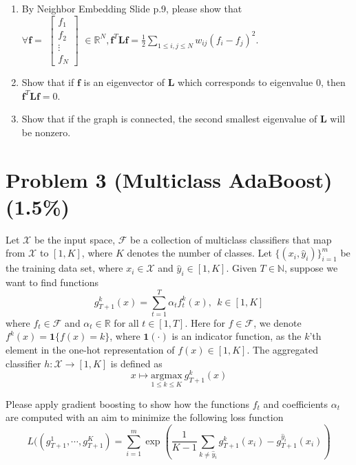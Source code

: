 \documentclass{article}
\begin{document}
\begin{enumerate}
\item By Neighbor Embedding Slide p.9, please show that \\
$ \forall \boldsymbol{f} =$
$\begin{bmatrix}
   f_1 \\
   f_2 \\
   \vdots \\
   f_N
\end{bmatrix}$
$\in \mathbb{R}^N, \boldsymbol{f}^T \boldsymbol{L} \boldsymbol{f}=\frac{1}{2}\sum\limits_{1 \leq i,j \leq N} w_{ij}(f_i-f_j)^2$.
\item Show that if $\boldsymbol{f}$ is an eigenvector of $\boldsymbol{L}$ which corresponds to eigenvalue 0, then $\boldsymbol{f}^T \boldsymbol{L} \boldsymbol{f}=0$.
\item Show that if the graph is connected, the second smallest eigenvalue 
 of $\boldsymbol{L}$ will be nonzero.

\end{enumerate}



\section*{Problem 3 (Multiclass AdaBoost)(1.5\%)}
Let $\mathcal{X}$ be the input space, $\mathscr F$ be a collection of multiclass classifiers that map from $\mathcal{X}$ to $[1, K]$, where $K$ denotes the number of classes.  Let $\{(x_i,{\hat y}_i)\}_{i=1}^m$ be the training data set, where $x_i \in \mathcal{X}$ and ${\hat y}_i \in [1,K]$.  Given $T \in \mathbb{N}$, suppose we want to find functions 
\begin{equation*}
g_{T+1}^k(x) = \sum_{t=1}^T \alpha_t f_t^k(x), ~~ k \in [ 1,K ]
\end{equation*}
where $f_t \in \mathscr F$ and $\alpha_t \in \mathbb{R}$ for all $t \in [1, T]$. Here for $f \in \mathscr F$, we denote $f^k(x) = \mathbf{1}\{f(x) = k\}$, where $\mathbf{1}(\cdot)$ is an indicator function, as the $k$'th element in the one-hot representation of $f(x) \in [ 1,K ]$. The aggregated classifier $h: \mathcal{X} \rightarrow [ 1,K ]$ is defined as
\begin{equation*}
x \mapsto \underset{1 \leq k \leq K}{\mbox{argmax}} ~ g_{T+1}^k(x)
\end{equation*}

Please apply gradient boosting to show how the functions $f_t$ and coefficients $\alpha_t$ are computed with an aim to minimize the following loss function
\begin{equation*}
L((g_{T+1}^1, \cdots, g_{T+1}^K) = \sum_{i=1}^m \exp\left(\frac{1}{K-1}\sum_{k \neq {\hat y}_i} g_{T+1}^{k}(x_i) - g_{T+1}^{{\hat y}_i}(x_i) \right)
\end{equation*}
\end{document}
